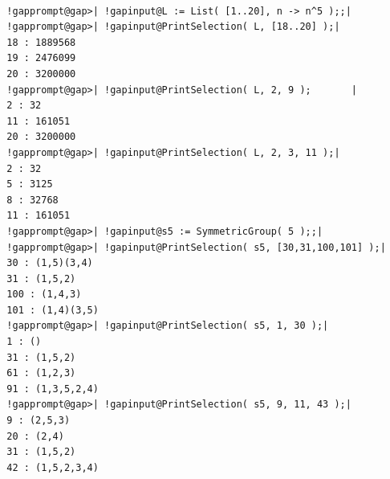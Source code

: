 \documentclass[a4paper,11pt]{report}
\begin{document}
{{{ }

 
\begin{Verbatim}[commandchars=!@|,fontsize=\small,frame=single,label=Example]
  
  !gapprompt@gap>| !gapinput@L := List( [1..20], n -> n^5 );;|
  !gapprompt@gap>| !gapinput@PrintSelection( L, [18..20] );|
  18 : 1889568
  19 : 2476099
  20 : 3200000
  !gapprompt@gap>| !gapinput@PrintSelection( L, 2, 9 );       |
  2 : 32
  11 : 161051
  20 : 3200000
  !gapprompt@gap>| !gapinput@PrintSelection( L, 2, 3, 11 );|
  2 : 32
  5 : 3125
  8 : 32768
  11 : 161051
  !gapprompt@gap>| !gapinput@s5 := SymmetricGroup( 5 );;|
  !gapprompt@gap>| !gapinput@PrintSelection( s5, [30,31,100,101] );|
  30 : (1,5)(3,4)
  31 : (1,5,2)
  100 : (1,4,3)
  101 : (1,4)(3,5)
  !gapprompt@gap>| !gapinput@PrintSelection( s5, 1, 30 );|
  1 : ()
  31 : (1,5,2)
  61 : (1,2,3)
  91 : (1,3,5,2,4)
  !gapprompt@gap>| !gapinput@PrintSelection( s5, 9, 11, 43 );|
  9 : (2,5,3)
  20 : (2,4)
  31 : (1,5,2)
  42 : (1,5,2,3,4)
  
\end{Verbatim}
 }

 }

         
\end{document}

